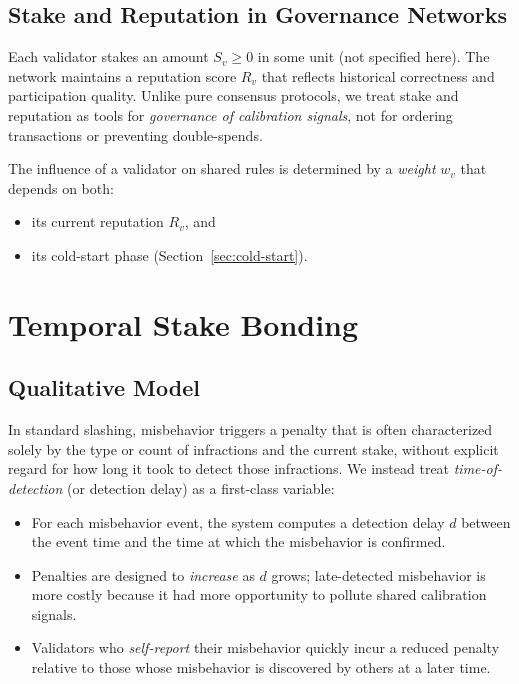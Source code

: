 \documentclass[11pt]{article}
\begin{document}
\subsection{Stake and Reputation in Governance Networks}

Each validator stakes an amount \(S_v \ge 0\) in some unit (not specified here).
The network maintains a reputation score \(R_v\) that reflects historical correctness and participation quality.
Unlike pure consensus protocols, we treat stake and reputation as tools for \emph{governance of calibration signals}, not for ordering transactions or preventing double-spends.

The influence of a validator on shared rules is determined by a \emph{weight} \(w_v\) that depends on both:
\begin{itemize}[leftmargin=*]
  \item its current reputation \(R_v\), and
  \item its cold-start phase (Section~\ref{sec:cold-start}).
\end{itemize}

\section{Temporal Stake Bonding}
\label{sec:temporal-bonding}

\subsection{Qualitative Model}

In standard slashing, misbehavior triggers a penalty that is often characterized solely by the type or count of infractions and the current stake, without explicit regard for how long it took to detect those infractions.
We instead treat \emph{time-of-detection} (or detection delay) as a first-class variable:

\begin{itemize}[leftmargin=*]
  \item For each misbehavior event, the system computes a detection delay \(d\) between the event time and the time at which the misbehavior is confirmed.
  \item Penalties are designed to \emph{increase} as \(d\) grows; late-detected misbehavior is more costly because it had more opportunity to pollute shared calibration signals.
  \item Validators who \emph{self-report} their misbehavior quickly incur a reduced penalty relative to those whose misbehavior is discovered by others at a later time.
\end{itemize}
\end{document}
